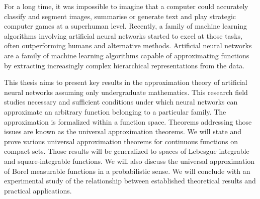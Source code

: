 For a long time, it was impossible to imagine that a computer could accurately classify and segment images, summarise or generate text and play strategic computer games at a superhuman level. Recently, a family of machine learning algorithms involving artificial neural networks started to excel at those tasks, often outperforming humans and alternative methods. Artificial neural networks are a family of machine learning algorithms capable of approximating functions by extracting increasingly complex hierarchical representations from the data.

This thesis aims to present key results in the approximation theory of artificial neural networks assuming only undergraduate mathematics. This research field studies necessary and sufficient conditions under which neural networks can approximate an arbitrary function belonging to a particular family. The approximation is formalized within a function space. Theorems addressing those issues are known as the universal approximation theorems. We will state and prove various universal approximation theorems for continuous functions on compact sets. Those results will be generalized to spaces of Lebesgue integrable and square-integrable functions. We will also discuss the universal approximation of Borel measurable functions in a probabilistic sense. We will conclude with an experimental study of the relationship between established theoretical results and practical applications.